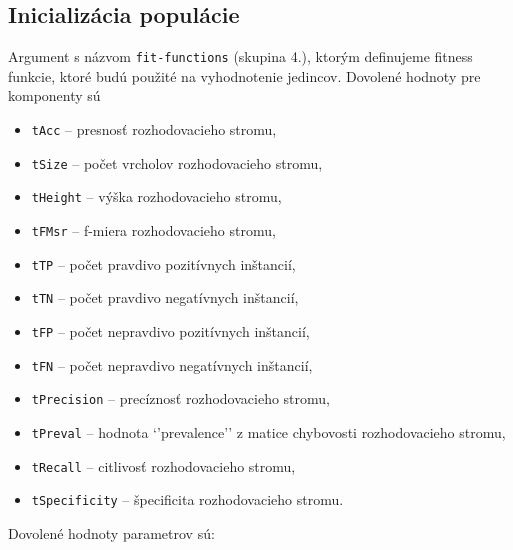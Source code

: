 \subsection*{Inicializácia populácie}
Argument s názvom \verb|fit-functions| (skupina 4.), ktorým definujeme fitness funkcie, ktoré budú použité na vyhodnotenie jedincov.
Dovolené hodnoty pre komponenty sú 
\begin{itemize}
\item \verb|tAcc| -- presnosť rozhodovacieho stromu,
\item \verb|tSize|  -- počet vrcholov rozhodovacieho stromu,
\item \verb|tHeight| -- výška rozhodovacieho stromu,
\item \verb|tFMsr| -- f-miera rozhodovacieho stromu,
\item \verb|tTP| -- počet pravdivo pozitívnych inštancií,
\item \verb|tTN| -- počet pravdivo negatívnych inštancií,
\item \verb|tFP| -- počet nepravdivo pozitívnych inštancií,
\item \verb|tFN| -- počet nepravdivo negatívnych inštancií,
\item \verb|tPrecision| -- precíznosť rozhodovacieho stromu,
\item \verb|tPreval| -- hodnota `'prevalence'' z matice chybovosti rozhodovacieho stromu,
\item \verb|tRecall| -- citlivosť rozhodovacieho stromu,
\item \verb|tSpecificity| -- špecificita rozhodovacieho stromu.
\end{itemize}

Dovolené hodnoty parametrov sú:

